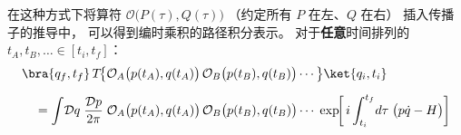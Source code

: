 在这种方式下将算符 $\mathcal{O}\bigl(P(\tau),Q(\tau)\bigr)$
（约定所有 $P$ 在左、$Q$ 在右）
插入传播子的推导中，
可以得到编时乘积的路径积分表示。
对于\textbf{任意}时间排列的 $t_A,t_B,\ldots\in[t_i,t_f]$：
\begin{equation}\label{eq:PI-T-product}
\begin{aligned}
  &\bra{q_f,t_f}\,T\!\bigl\{
    \mathcal{O}_A\bigl(p(t_A),q(t_A)\bigr)\,
    \mathcal{O}_B\bigl(p(t_B),q(t_B)\bigr)\cdots
  \bigr\}\ket{q_i,t_i}\\[6pt]
  &\quad=\int\!\mathcal{D}q\;\frac{\mathcal{D}p}{2\pi}\;
    \mathcal{O}_A\bigl(p(t_A),q(t_A)\bigr)\,
    \mathcal{O}_B\bigl(p(t_B),q(t_B)\bigr)\cdots\;
    \exp\!\biggl[\,i\int_{t_i}^{t_f}\!d\tau\;
      \bigl(p\dot{q}-H\bigr)
    \biggr]
\end{aligned}
\end{equation}
